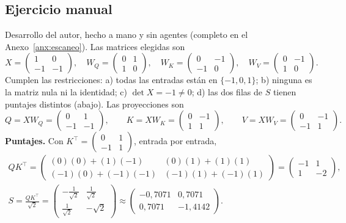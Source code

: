 \documentclass[10pt]{article}
\begin{document}
\subsection{Ejercicio manual}\label{sec:manual1}
Desarrollo del autor, hecho a mano y sin agentes (completo en el Anexo~\ref{anx:escaneo}).
Las matrices elegidas son
\[
  X=\begin{pmatrix}1&0\\-1&-1\end{pmatrix},\quad
  W_Q=\begin{pmatrix}0&1\\1&0\end{pmatrix},\quad
  W_K=\begin{pmatrix}0&-1\\-1&0\end{pmatrix},\quad
  W_V=\begin{pmatrix}0&-1\\1&0\end{pmatrix}.
\]
Cumplen las restricciones: a) todas las entradas están en $\{-1,0,1\}$; b) ninguna es la matriz
nula ni la identidad; c) $\det X = -1\neq0$; d) las dos filas de $S$ tienen puntajes distintos
(abajo). Las proyecciones son
\[
  Q = XW_Q = \begin{pmatrix}0&1\\-1&-1\end{pmatrix},\qquad
  K = XW_K = \begin{pmatrix}0&-1\\1&1\end{pmatrix},\qquad
  V = XW_V = \begin{pmatrix}0&-1\\-1&1\end{pmatrix}.
\]
\textbf{Puntajes.} Con $K^\top = \begin{pmatrix}0&1\\-1&1\end{pmatrix}$, entrada por entrada,
\begin{gather*}
  QK^\top = \begin{pmatrix}(0)(0)+(1)(-1) & (0)(1)+(1)(1)\\ (-1)(0)+(-1)(-1) & (-1)(1)+(-1)(1)\end{pmatrix}
  = \begin{pmatrix}-1&1\\1&-2\end{pmatrix},\\
  S = \frac{QK^\top}{\sqrt2} = \begin{pmatrix}-\tfrac1{\sqrt2}&\tfrac1{\sqrt2}\\[0.4ex] \tfrac1{\sqrt2}&-\sqrt2\end{pmatrix}
  \approx \begin{pmatrix}-0{,}7071&0{,}7071\\0{,}7071&-1{,}4142\end{pmatrix}.
\end{gather*}
\end{document}
